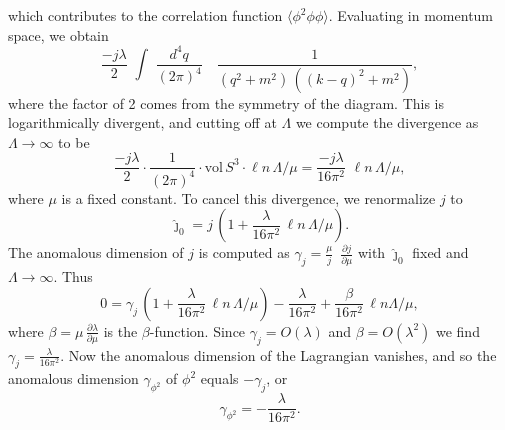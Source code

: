 \noindent
which contributes to the correlation function
$\langle\phi^2\phi\phi\rangle$.  Evaluating in momentum
space, we obtain
$$
\frac{-j\lambda}{2}\,\,\int\,\,\frac{d^4q}{(2\pi)^4}\quad\frac
{1}{(q^2+m^2)\,((k-q)^2+m^2)},
$$
where the factor of 2 comes from the symmetry of the diagram.
This is logarithmically divergent, and cutting off at
$\Lambda$ we compute the divergence as
$\Lambda\longrightarrow\infty$ to be 
$$
\frac{-j\lambda}{2}\cdot\frac{1}{(2\pi)^4}\cdot\text{vol}\,
S^3\cdot
\ell n\,\Lambda\slash\mu =
\frac{-j\lambda}{16\pi^2}\,\,\ell
n\,\Lambda\slash\mu,
$$
where $\mu$ is a fixed constant.
\medskip
To cancel this divergence, we renormalize $j$ to 
$$
\hat{\jmath}_0=j\,\left(1+\frac{\lambda}{16\pi^2}\,\ell
n\,\Lambda\slash\mu\right).
$$
The anomalous dimension of $j$ is computed as
$\gamma_j=\frac{\mu}{j}\,\,\,\frac{\partial j}{\partial\mu}$
with $\hat{\jmath}_0$ fixed and $\Lambda\longrightarrow\infty$.
Thus
$$
0=\gamma_j\,\left(1+\frac{\lambda}{16\pi^2}\,\ell
n\,\Lambda\slash
\mu\right)-
\frac{\lambda}{16\pi^2}+\frac
{\beta}{16\pi^2}\,\ell n
\Lambda\slash\mu,
$$
where $\beta=\mu\,\frac{\partial\lambda}{\partial\mu}$ is
the $\beta$-function.  Since $\gamma_j=O(\lambda)$ and
$\beta=O(\lambda^2)$ we find
$\gamma_j=\frac{\lambda}{16\pi^2}$.  Now the anomalous
dimension of the Lagrangian vanishes, and so the anomalous
dimension $\gamma_{\phi^2}$ of $\phi^2$ equals 
$-\gamma_j$, or 
$$
\gamma_{\phi^2}=-\frac{\lambda}{16\pi^2}.
$$
\bye


